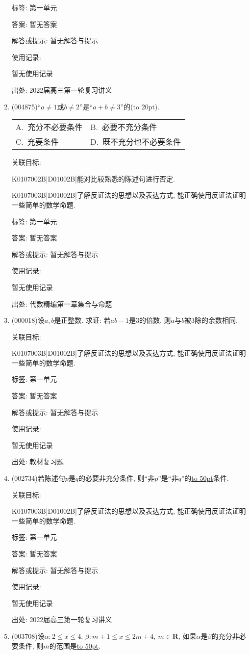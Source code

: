\documentclass[10pt,a4paper]{article}
\newcommand{\blank}[1]{\underline{\hbox to #1pt{}}}
\newcommand{\bracket}[1]{(\hbox to #1pt{})}
\newcommand{\twoch}[4]{\par\begin{tabular}{p{.46\textwidth}p{.46\textwidth}}
A.~#1& B.~#2\\
C.~#3& D.~#4
\end{tabular}}
\begin{document}
\begin{enumerate}[1.]
标签: 第一单元

答案: 暂无答案

解答或提示: 暂无解答与提示

使用记录:

暂无使用记录


出处: 2022届高三第一轮复习讲义
\item { (004875)}``$a\ne 1$或$b\ne 2$''是``$a+b\ne 3$''的\bracket{20}.
\twoch{充分不必要条件}{必要不充分条件}{充要条件}{既不充分也不必要条件}


关联目标:

K0107002B|D01002B|能对比较熟悉的陈述句进行否定.

K0107003B|D01002B|了解反证法的思想以及表达方式, 能正确使用反证法证明一些简单的数学命题.



标签: 第一单元

答案: 暂无答案

解答或提示: 暂无解答与提示

使用记录:

暂无使用记录


出处: 代数精编第一章集合与命题
\item { (000018)}设$a,b$是正整数. 求证: 若$ab-1$是$3$的倍数, 则$a$与$b$被$3$除的余数相同.


关联目标:

K0107003B|D01002B|了解反证法的思想以及表达方式, 能正确使用反证法证明一些简单的数学命题.



标签: 第一单元

答案: 暂无答案

解答或提示: 暂无解答与提示

使用记录:

暂无使用记录


出处: 教材复习题
\item { (002734)}若陈述句$p$是$q$的必要非充分条件, 则``非$p$''是``非$q$''的\blank{50}条件.


关联目标:

K0107003B|D01002B|了解反证法的思想以及表达方式, 能正确使用反证法证明一些简单的数学命题.



标签: 第一单元

答案: 暂无答案

解答或提示: 暂无解答与提示

使用记录:

暂无使用记录


出处: 2022届高三第一轮复习讲义
\item { (003708)}设$\alpha:2\le x\le 4$, $\beta: m+1\le x\le 2m+4, \ m\in \mathbf{R}$, 如果$\alpha$是$\beta$的充分非必要条件, 则$m$的范围是\blank{50}.



\end{enumerate}
\end{document}
